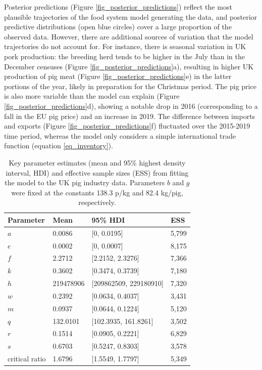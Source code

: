 \documentclass[12pt]{article}
\begin{document}
Posterior predictions (Figure \ref{fig_posterior_predictions}) reflect the most plausible trajectories of the food system model generating the data, and posterior predictive distributions (open blue circles) cover a large proportion of the observed data. However, there are additional sources of variation that the model trajectories do not account for. For instance, there is seasonal variation in UK pork production: the breeding herd tends to be higher in the July than in the December censuses (Figure \ref{fig_posterior_predictions}a), resulting in higher UK production of pig meat (Figure \ref{fig_posterior_predictions}e) in the latter portions of the year, likely in preparation for the Christmas period. The pig price is also more variable than the model can explain (Figure \ref{fig_posterior_predictions}d), showing a notable drop in 2016 (corresponding to a fall in the EU pig price) and an increase in 2019. The difference between imports and exports (Figure \ref{fig_posterior_predictions}f) fluctuated over the 2015-2019 time period, whereas the model only considers a simple international trade function (equation \ref{eq_inventory}).

\begin{table}[t!]
  \centering
  \footnotesize
  \begin{tabular}{p{5cm}p{3cm}p{5cm}p{2cm}}
    \textbf{Parameter} & \textbf{Mean} & \textbf{95\% HDI} & \textbf{ESS} \\ \hline
    $a$ & 0.0086 & [0, 0.0195] & 5,799 \\
    $e$ & 0.0002 & [0, 0.0007] & 8,175 \\
    $f$ & 2.2712 & [2.2152, 2.3276] & 7,366 \\
    $k$ & 0.3602 & [0.3474, 0.3739] & 7,180 \\
    $h$ & 219478906 & [209862509, 229180910] & 7,320 \\
    $w$ & 0.2392 & [0.0634, 0.4037] & 3,431 \\
    $m$ & 0.0937 & [0.0644, 0.1224] & 5,120 \\
    $q$ & 132.0101 & [102.3935, 161.8261] & 3,502 \\
    $r$ & 0.1514 & [0.0905, 0.2221] & 6,829 \\
    $s$ & 0.6703 & [0.5247, 0.8303] & 3,578 \\
    critical ratio & 1.6796 & [1.5549, 1.7797] & 5,349 \\
  \end{tabular}
  \caption{Key parameter estimates (mean and 95\% highest density interval, HDI) and effective sample sizes (ESS) from fitting the model to the UK pig industry data. Parameters $b$ and $g$ were fixed at the constants 138.3 p/kg and 82.4 kg/pig, respectively.}
  \label{table_parameter_estimates}
\end{table}
\end{document}
